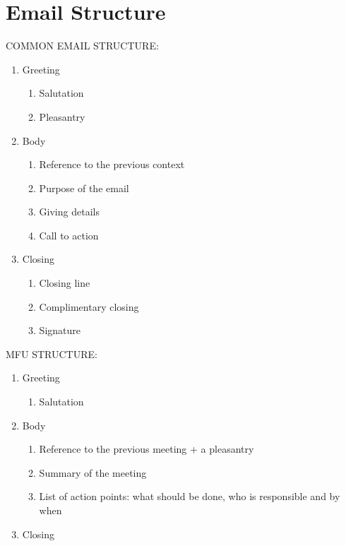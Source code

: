 \section{Email Structure}

COMMON EMAIL STRUCTURE:
\begin{enumerate}
\item Greeting
	\begin{enumerate}
	\item Salutation
	\item Pleasantry	
	\end{enumerate}
\item Body
	\begin{enumerate}
	\item Reference to the previous context
	\item Purpose of the email
	\item Giving details
	\item Call to action
	\end{enumerate}
\item Closing
	\begin{enumerate}
	\item Closing line
	\item Complimentary closing
	\item Signature
	\end{enumerate}
\end{enumerate}

MFU STRUCTURE:
\begin{enumerate}
\item Greeting
	\begin{enumerate}
	\item Salutation
	\end{enumerate}
\item Body
	\begin{enumerate}
	\item Reference to the previous meeting + a pleasantry
	\item Summary of the meeting
	\item List of action points: what should be done, who is responsible and by when
	\end{enumerate}
\item Closing
\end{enumerate}

\newpage